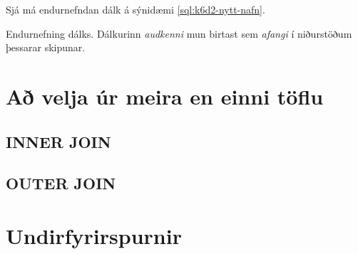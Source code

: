 Sjá má endurnefndan dálk á sýnidæmi \ref{sql:k6d2-nytt-nafn}.

\begin{example}
\caption[Endurnefning]{Endurnefning dálks. Dálkurinn \emph{audkenni} mun birtast sem \emph{afangi} í niðurstöðum þessarar skipunar.}
\label{sql:k6d2-nytt-nafn}
\centering
{}
\end{example}

\section{Að velja úr meira en einni töflu}

\subsection{INNER JOIN}
\subsection{OUTER JOIN}
\section{Undirfyrirspurnir}
\label{undirkafli:undirfyrirspurnir}